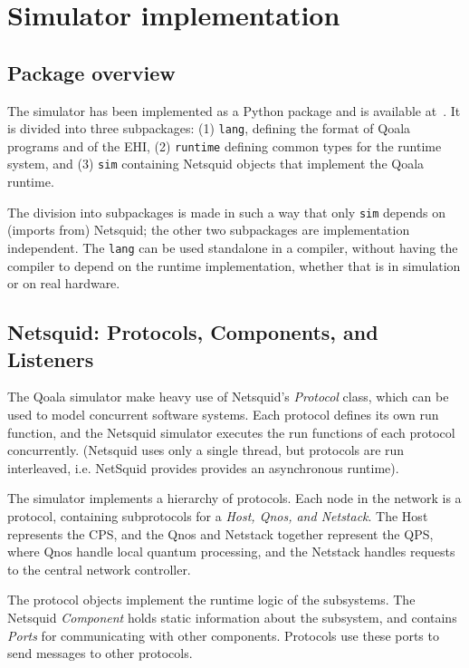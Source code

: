 \section{Simulator implementation}
\label{sec:app:simulator}

\subsection{Package overview}
The simulator has been implemented as a Python package and is available at~\cite{qoala2023simulator}.
It is divided into three subpackages: (1) \texttt{lang}, defining the format of Qoala programs and of the EHI, (2) \texttt{runtime} defining common types for the runtime system, and (3) \texttt{sim} containing Netsquid objects that implement the Qoala runtime.

The division into subpackages is made in such a way that only \texttt{sim} depends on (imports from) Netsquid; the other two subpackages are implementation independent.
The \texttt{lang} can be used standalone in a compiler, without having the compiler to depend on the runtime implementation, whether that is in simulation or on real hardware.


\subsection{Netsquid: Protocols, Components, and Listeners}
The Qoala simulator make heavy use of Netsquid's \textit{Protocol} class,
which can be used to model concurrent software systems. 
Each protocol defines its own run function, and the Netsquid simulator
executes the run functions of each protocol concurrently.
(Netsquid uses only a single thread, but protocols are run interleaved, i.e. NetSquid provides provides an asynchronous runtime).

The simulator implements a hierarchy of protocols. 
Each node in the network is a protocol, containing subprotocols for a \textit{Host, Qnos, and Netstack}. The Host represents the CPS, and the Qnos and Netstack together represent the QPS, where Qnos handle local quantum processing, and the Netstack handles requests to the central network controller. 

The protocol objects implement the runtime logic of the subsystems.
The Netsquid \textit{Component} holds static information about the subsystem, and contains \textit{Ports} for communicating with other components. Protocols use these ports to send messages to other protocols. 


